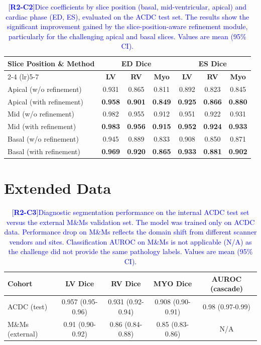 \documentclass[fleqn,10pt]{wlscirep}
\newcommand{\revtag}[2]{[\textbf{R#1-C#2}]}
\newcommand{\Rtwo}[1]{\textcolor{blue}{#1}}
\begin{document}
\begin{table}[!htbp]
  \centering
  \caption{\Rtwo{\revtag{2}{2}Dice coefficients by slice position (basal, mid-ventricular, apical) and cardiac phase (ED, ES), evaluated on the ACDC test set. The results show the significant improvement gained by the slice-position-aware refinement module, particularly for the challenging apical and basal slices. Values are mean (95\% CI).}}
  \label{tab:apical_basal_performance}
  \begin{tabular}{lcccccc}
    \toprule
    \multirow{2}{*}{\textbf{Slice Position \& Method}} & \multicolumn{3}{c}{\textbf{ED Dice}} & \multicolumn{3}{c}{\textbf{ES Dice}} \\
    \cmidrule(lr){2-4} \cmidrule(lr){5-7}
    & \textbf{LV} & \textbf{RV} & \textbf{Myo} & \textbf{LV} & \textbf{RV} & \textbf{Myo} \\
    \midrule
    Apical (w/o refinement) & 0.931 & 0.865 & 0.811 & 0.892 & 0.823 & 0.845 \\
    Apical (with refinement) & \textbf{0.958} & \textbf{0.901} & \textbf{0.849} & \textbf{0.925} & \textbf{0.866} & \textbf{0.880} \\
    \midrule
    Mid (w/o refinement) & 0.982 & 0.955 & 0.912 & 0.951 & 0.922 & 0.931 \\
    Mid (with refinement) & \textbf{0.983} & \textbf{0.956} & \textbf{0.915} & \textbf{0.952} & \textbf{0.924} & \textbf{0.933} \\
    \midrule
    Basal (w/o refinement) & 0.945 & 0.889 & 0.833 & 0.908 & 0.850 & 0.871 \\
    Basal (with refinement) & \textbf{0.969} & \textbf{0.920} & \textbf{0.865} & \textbf{0.933} & \textbf{0.881} & \textbf{0.902} \\
    \bottomrule
  \end{tabular}
\end{table}

\section*{Extended Data}
\renewcommand{\thetable}{E\arabic{table}}
\setcounter{table}{0}


\begin{table}[!htbp]
  \caption{\Rtwo{\revtag{2}{3}Diagnostic segmentation performance on the internal ACDC test set versus the external M\&Ms validation set. The model was trained only on ACDC data. Performance drop on M\&Ms reflects the domain shift from different scanner vendors and sites. Classification AUROC on M\&Ms is not applicable (N/A) as the challenge did not provide the same pathology labels. Values are mean (95\% CI).}}
  \label{tab:performance}
  \centering
  \begin{tabular}{lcccc}
    \toprule
    Cohort & LV Dice & RV Dice & MYO Dice & AUROC (cascade) \\
    \midrule
    ACDC (test) & 0.957 (0.95-0.96) & 0.931 (0.92-0.94) & 0.908 (0.90-0.91) & 0.98 (0.97-0.99) \\
    M\&Ms (external) & 0.91 (0.90-0.92) & 0.86 (0.84-0.88) & 0.85 (0.83-0.86) & N/A \\
    \bottomrule
  \end{tabular}
\end{table}
\end{document}
